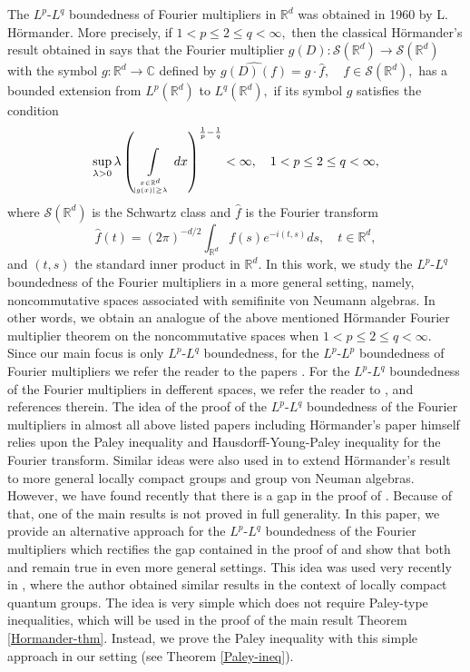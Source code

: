 \documentclass[a4paper,12pt]{amsart}
\numberwithin{equation}{section}
\theoremstyle{definition}
\begin{document}
 The $L^p$-$L^q$ boundedness of Fourier multipliers in $\mathbb{R}^d$ was obtained in 1960 by L. H\"ormander. More precisely, if $1 < p \leq  2\leq q <\infty,$ then the classical H\"ormander's result obtained in \cite[Theorem 1.11]{Hor} says that the Fourier multiplier $g(D):\mathcal{S}(\mathbb{R}^d)\to\mathcal{S}(\mathbb{R}^d)$ with the symbol $g:\mathbb{R}^d \to \mathbb{C}$ defined by $\widehat{g(D)(f)}=g \cdot \widehat{f}, \quad f\in\mathcal{S}(\mathbb{R}^d),$ has a bounded extension from $L^p(\mathbb{R}^{d})$ to $L^q(\mathbb{R}^{d}),$ if its symbol $g$ satisfies the condition 
$$\sup\limits_{\lambda>0}\lambda\left(\int\limits_{x\in\mathbb{R}^d \atop  |g(x)|\geq\lambda}dx\right)^{\frac{1}{p}-\frac{1}{q}}<\infty, \quad 1 < p \leq  2\leq q <\infty,$$
where $\mathcal{S}(\mathbb{R}^d)$ is the Schwartz class and
$\widehat{f}$ is the Fourier transform
$$\widehat{f}(t)=(2\pi)^{-d/2}\int_{\mathbb{R}^d}f(s)e^{-i(t,s)}ds, \quad t\in \mathbb{R}^d,$$ and $(t,s)$  the standard inner product in $\mathbb{R}^d.$  
In this work, we study the $L^p$-$L^q$ boundedness of the Fourier multipliers in a more general setting, namely, noncommutative spaces associated with semifinite von Neumann algebras. In other words, we obtain an analogue of the above mentioned H\"ormander Fourier multiplier theorem on the noncommutative spaces when $1 < p \leq  2\leq q <\infty.$ 
 Since our main focus is only $L^p$-$L^q$ boundedness, for the $L^p$-$L^p$ boundedness of Fourier multipliers we refer the reader to the papers \cite{Hor, KM, Mikh, Mar, Stein}. For the $L^p$-$L^q$ boundedness of the Fourier multipliers in defferent spaces, we refer the reader to \cite{AR, AMR, ARN, CK, Cow1993, Cow1974, K2, K3, K4, Mc, M-Nur, NT1, NT2, RV, RST1, RST2, Z}, and references therein. The idea of the proof of the $L^p$-$L^q$ boundedness of the Fourier multipliers in almost all above listed papers including  H\"ormander's paper \cite{Hor} himself relies
upon the Paley inequality and Hausdorff-Young-Paley inequality for the Fourier transform. Similar ideas were also used in \cite{AR} to extend H\"ormander's result to more general locally compact groups and group von Neuman algebras. However, we have found recently that there is a gap in the proof of \cite[Theorem 3.1]{AR}. Because of that, one of the main results \cite[Theorem 5.1]{AR} is not proved in full generality. In this paper, we provide an alternative approach for the $L^p$-$L^q$ boundedness of the Fourier multipliers which rectifies the gap contained in the proof of \cite[Theorem 3.1]{AR} and show that both \cite[Theorem 3.1]{AR} and \cite[Theorem 5.1]{AR} remain true in even more general settings. This idea was used very recently in \cite{Z}, where the author obtained similar results in the context of locally compact quantum groups. The idea is very simple which does not require Paley-type inequalities, which will be used in the proof of the main result Theorem \ref{Hormander-thm}. Instead, we prove the Paley inequality with this simple approach in our setting (see Theorem \ref{Paley-ineq}).
\end{document}
